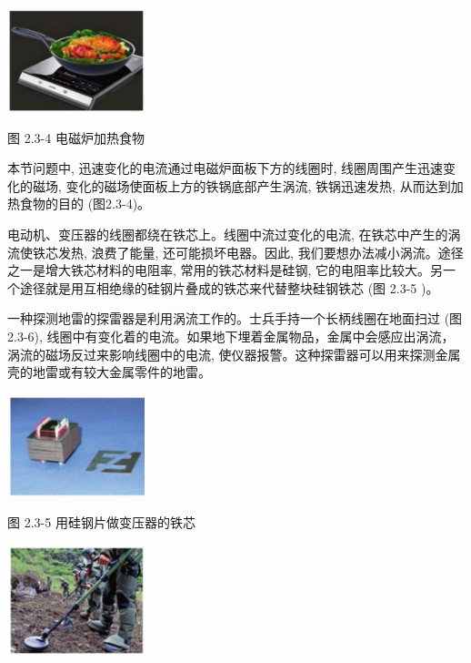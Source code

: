 \documentclass[10pt]{article}
\begin{document}
\begin{center}
\includegraphics[max width=0.3\textwidth]{images/01910e72-c5b7-7ed5-a6d4-fb3a5faefc32_41_193077.jpg}
\end{center}

图 2.3-4 电磁炉加热食物

本节问题中, 迅速变化的电流通过电磁炉面板下方的线圈时, 线圈周围产生迅速变化的磁场, 变化的磁场使面板上方的铁锅底部产生涡流, 铁锅迅速发热, 从而达到加热食物的目的 (图2.3-4)。

电动机、变压器的线圈都绕在铁芯上。线圈中流过变化的电流, 在铁芯中产生的涡流使铁芯发热, 浪费了能量, 还可能损坏电器。因此, 我们要想办法减小涡流。途径之一是增大铁芯材料的电阻率, 常用的铁芯材料是硅钢, 它的电阻率比较大。另一个途径就是用互相绝缘的硅钢片叠成的铁芯来代替整块硅钢铁芯 (图 2.3-5 )。

一种探测地雷的探雷器是利用涡流工作的。士兵手持一个长柄线圈在地面扫过 (图 2.3-6), 线圈中有变化着的电流。如果地下埋着金属物品，金属中会感应出涡流，涡流的磁场反过来影响线圈中的电流, 使仪器报警。这种探雷器可以用来探测金属壳的地雷或有较大金属零件的地雷。

\begin{center}
\includegraphics[max width=0.3\textwidth]{images/01910e72-c5b7-7ed5-a6d4-fb3a5faefc32_42_881697.jpg}
\end{center}

图 2.3-5 用硅钢片做变压器的铁芯

\begin{center}
\includegraphics[max width=0.3\textwidth]{images/01910e72-c5b7-7ed5-a6d4-fb3a5faefc32_42_793802.jpg}
\end{center}
\end{document}
